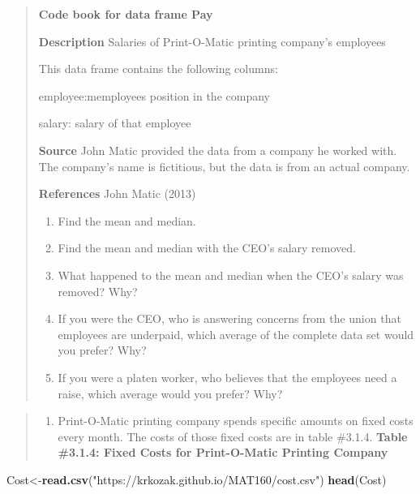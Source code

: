 \documentclass[]{book}
\newenvironment{Shaded}{\begin{snugshade}}{\end{snugshade}}
\newcommand{\KeywordTok}[1]{\textcolor[rgb]{0.13,0.29,0.53}{\textbf{#1}}}
\newcommand{\NormalTok}[1]{#1}
\newcommand{\StringTok}[1]{\textcolor[rgb]{0.31,0.60,0.02}{#1}}
\providecommand{\tightlist}{%
  \setlength{\itemsep}{0pt}\setlength{\parskip}{0pt}}
\begin{document}
\begin{quote}
\textbf{Code book for data frame Pay}

\textbf{Description}
Salaries of Print-O-Matic printing company's employees

This data frame contains the following columns:

employee:memployees position in the company

salary: salary of that employee

\textbf{Source}
John Matic provided the data from a company he worked with. The company's name is fictitious, but the data is from an actual company.

\textbf{References}
John Matic (2013)

\begin{enumerate}
\def\labelenumi{\alph{enumi}.}
\item
  Find the mean and median.
\item
  Find the mean and median with the CEO's salary removed.
\item
  What happened to the mean and median when the CEO's salary was removed? Why?
\item
  If you were the CEO, who is answering concerns from the union that employees are underpaid, which average of the complete data set would you prefer? Why?
\item
  If you were a platen worker, who believes that the employees need a raise, which average would you prefer? Why?
\end{enumerate}
\end{quote}

\begin{quote}
\begin{enumerate}
\def\labelenumi{\arabic{enumi}.}
\setcounter{enumi}{3}
\tightlist
\item
  Print-O-Matic printing company spends specific amounts on fixed costs every month. The costs of those fixed costs are in table \#3.1.4.
  \textbf{Table \#3.1.4: Fixed Costs for Print-O-Matic Printing Company}
\end{enumerate}
\end{quote}

\begin{Shaded}
\begin{Highlighting}[]
\NormalTok{Cost<-}\KeywordTok{read.csv}\NormalTok{(}\StringTok{"https://krkozak.github.io/MAT160/cost.csv"}\NormalTok{)}
\KeywordTok{head}\NormalTok{(Cost)}
\end{Highlighting}
\end{Shaded}
\end{document}
